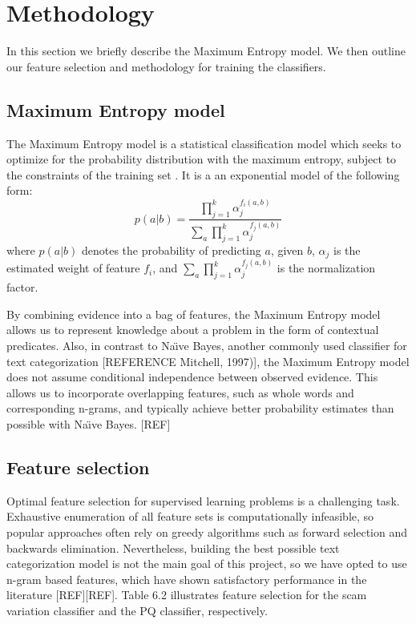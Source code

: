 \section{Methodology}
In this section we briefly describe the Maximum Entropy model. We then outline our feature selection and methodology for training the classifiers.

\subsection{Maximum Entropy model}
The Maximum Entropy model is a statistical classification model which seeks to optimize for the probability distribution with the maximum entropy, subject to the constraints of the training set . It is a an exponential model of the following form:
\begin{equation}
	p(a|b) = \frac{\prod_{j=1}^{k} \alpha_j^{f_i(a,b)}}{\sum_{a} \prod_{j=1}^{k} \alpha_j^{f_j(a,b)}}
\end{equation}
where $p(a|b)$ denotes the probability of predicting $a$, given $b$, $\alpha_{j}$ is the estimated weight of feature $f_{i}$, and $\sum_{a} \prod_{j=1}^{k} \alpha_j^{f_j(a,b)}$ is the normalization factor. 

By combining evidence into a bag of features, the Maximum Entropy model allows us to represent knowledge about a problem in the form of contextual predicates. Also, in contrast to Na\"{\i}ve Bayes, another commonly used classifier for text categorization [REFERENCE Mitchell, 1997)], the Maximum Entropy model does not assume conditional independence between observed evidence. This allows us to incorporate overlapping features, such as whole words and corresponding n-grams, and typically achieve better probability estimates than possible with Na\"{\i}ve Bayes. [REF]

\subsection{Feature selection}
Optimal feature selection for supervised learning problems is a challenging task. Exhaustive enumeration of all feature sets is computationally infeasible, so popular approaches often rely on greedy algorithms such as forward selection and backwards elimination. Nevertheless, building the best possible text categorization model is not the main goal of this project, so we have opted to use n-gram based features, which have shown satisfactory performance in the literature [REF][REF]. Table 6.2 illustrates feature selection for the scam variation classifier and the PQ classifier, respectively.

